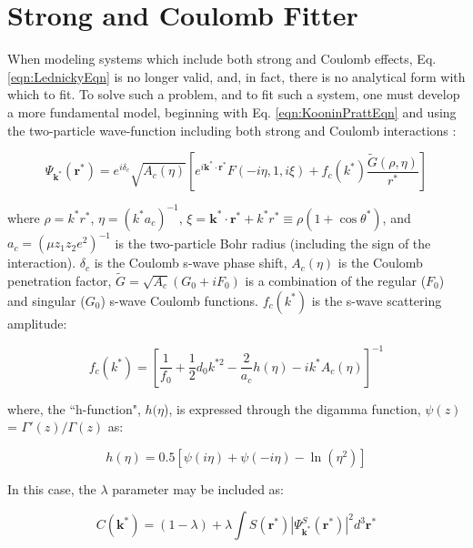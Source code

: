 \documentclass[ALICE,manyauthors]{cernphprep}
\begin{document}
\section{Strong and Coulomb Fitter}
\label{App:CoulombFitter}

When modeling systems which include both strong and Coulomb effects, Eq. \ref{eqn:LednickyEqn} is no longer valid, and, in fact, there is no analytical form with which to fit.
To solve such a problem, and to fit such a system, one must develop a more fundamental model, beginning with Eq. \ref{eqn:KooninPrattEqn} and using the two-particle wave-function including both strong and Coulomb interactions \cite{Lednicky:2005tb}:

\begin{equation}
 \Psi_{\mathbf{k^{*}}}(\mathbf{r^{*}}) = e^{i\delta_{c}}\sqrt{A_{c}(\eta)}[e^{i\mathbf{k^{*}} \cdot \mathbf{r^{*}}}F(-i\eta,1,i\xi) + f_{c}(k^{*})\frac{\tilde{G}(\rho,\eta)}{r^{*}}]
\label{eqn:CoulombWaveFcn}
\end{equation}

where $\rho = k^{*}r^{*}$, $\eta = (k^{*}a_{c})^{-1}$, $\xi = \mathbf{k^{*}} \cdot \mathbf{r^{*}} + k^{*}r^{*} \equiv \rho(1+\cos\theta^{*})$, and $a_{c} = (\mu z_{1}z_{2}e^{2})^{-1}$ is the two-particle Bohr radius (including the sign of the interaction).  
$\delta_{c}$ is the Coulomb s-wave phase shift, $A_{c}(\eta)$ is the Coulomb penetration factor, $\tilde{G} = \sqrt{A_{c}}(G_{0} + iF_{0})$ is a combination of the regular ($F_{0}$) and singular ($G_{0}$) s-wave Coulomb functions.  
$f_{c}(k^{*})$ is the s-wave scattering amplitude:

\begin{equation}
 f_{c}(k^{*}) = [\frac{1}{f_{0}} + \frac{1}{2}d_{0}k^{*2} - \frac{2}{a_{c}}h(\eta) - ik^{*}A_{c}(\eta)]^{-1}
\label{eqn:CoulombScattAmp}
\end{equation}

where, the ``h-function", $h(\eta$), is expressed through the digamma function, $\psi(z)$ = $\Gamma'(z)/\Gamma(z)$ as:

\begin{equation}
 h(\eta) = 0.5[\psi(i\eta) + \psi(-i\eta) - \ln(\eta^{2})]
\label{eqn:LednickyHFunction}
\end{equation} 

In this case, the $\lambda$ parameter may be included as: 

\begin{equation}
 C(\mathbf{k^{*}}) = (1 - \lambda) + \lambda\int S(\mathbf{r^{*}})|\Psi^{S}_{\mathbf{k^{*}}}(\mathbf{r^{*}})|^{2}d^{3}\mathbf{r^{*}}
\label{eqn:GenCfEqnwLambda}
\end{equation}
\end{document}
